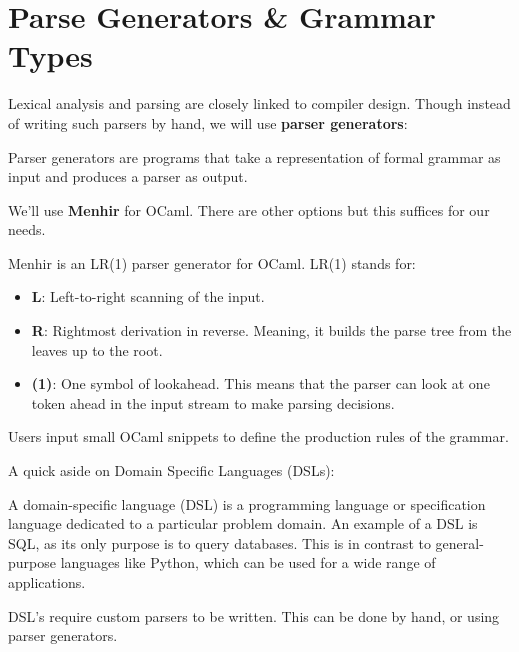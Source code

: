 \section{Parse Generators \& Grammar Types}


Lexical analysis and parsing are closely linked to 
compiler design. Though instead of writing such parsers by 
hand, we will use \textbf{parser generators}:

\begin{Def}

    \label{def:parser-generator}
    Parser generators are programs that take a representation of formal grammar as input and produces a parser as output.
\end{Def}

\noindent
We'll use \textbf{Menhir} for OCaml. There are other options but this suffices for our needs.
\begin{Def}[Menhir]

    Menhir is an LR(1) parser generator for OCaml. LR(1) stands for:
    \begin{itemize}
        \item \textbf{L}: Left-to-right scanning of the input.
        \item \textbf{R}: Rightmost derivation in reverse. Meaning, it builds the parse tree from the leaves up to the root.
        \item \textbf{(1)}: One symbol of lookahead. This means that the parser can look at one token ahead in the input stream to make parsing decisions.
    \end{itemize}
    \noindent
    Users input small OCaml snippets to define the production rules of the grammar.
\end{Def}

\newpage 

\noindent
A quick aside on Domain Specific Languages (DSLs):

\begin{Def}

    A domain-specific language (DSL) is a programming language or specification language dedicated to a particular problem domain.
    An example of a DSL is SQL, as its only purpose is to query databases. This is in contrast to general-purpose languages like Python, which can be used for a wide range of applications.

    DSL's require custom parsers to be written. This can be done by hand, or using parser generators.
\end{Def}


